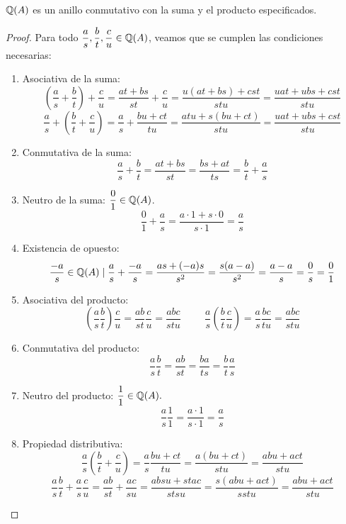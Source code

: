 \begin{lema}
    $\mathbb Q(A)$ es un anillo conmutativo con la suma y el producto especificados.
\end{lema}
\begin{proof}
    Para todo $\dfrac{a}{s}, \dfrac{b}{t}, \dfrac{c}{u} \in \mathbb Q(A)$, veamos que se cumplen las condiciones necesarias:
    \begin{enumerate}
        \item Asociativa de la suma:
        $$\left(\dfrac{a}{s} + \dfrac{b}{t}\right) + \dfrac{c}{u} = \dfrac{at + bs}{st} + \dfrac{c}{u} = \dfrac{u(at+bs)+cst}{stu}
            = \dfrac{uat + ubs + cst}{stu}$$
        $$\dfrac{a}{s} + \left(\dfrac{b}{t} + \dfrac{c}{u} \right) = \dfrac{a}{s}+ \dfrac{bu + ct}{tu} = \dfrac{atu + s(bu+ct)}{stu}
            = \dfrac{uat + ubs + cst}{stu}$$

        \item Conmutativa de la suma:
        $$\dfrac{a}{s} + \dfrac{b}{t} = \dfrac{at + bs}{st} = \dfrac{bs + at}{ts} = \dfrac{b}{t} + \dfrac{a}{s}$$

        \item Neutro de la suma: $\dfrac{0}{1} \in \mathbb Q(A)$.
        $$\dfrac{0}{1} + \dfrac{a}{s} = \dfrac{a\cdot 1 + s\cdot 0}{s \cdot 1} = \dfrac{a}{s}$$

        \item Existencia de opuesto:
        $$\dfrac{-a}{s} \in \mathbb Q(A) \mid \dfrac{a}{s} + \dfrac{-a}{s} = \dfrac{as + (-a)s}{s^2} = \dfrac{s(a-a)}{s^2} =
            \dfrac{a-a}{s} = \dfrac{0}{s} = \dfrac{0}{1}$$

        \item Asociativa del producto:
        $$\left(\dfrac{a}{s} \dfrac{b}{t} \right) \dfrac{c}{u} = \dfrac{ab}{st} \dfrac{c}{u} = \dfrac{abc}{stu}
        \hspace{1cm}
        \dfrac{a}{s} \left(\dfrac{b}{t} \dfrac{c}{u} \right) = \dfrac{a}{s} \dfrac{bc}{tu} = \dfrac{abc}{stu}$$

        \item Conmutativa del producto:
        $$\dfrac{a}{s} \dfrac{b}{t} = \dfrac{ab}{st} = \dfrac{ba}{ts} = \dfrac{b}{t} \dfrac{a}{s}$$

        \item Neutro del producto: $\dfrac{1}{1}\in \mathbb Q(A).$
        $$\dfrac{a}{s} \dfrac{1}{1} = \dfrac{a \cdot 1}{s \cdot 1} = \dfrac{a}{s}$$

        \item Propiedad distributiva:
        $$\dfrac{a}{s} \left( \dfrac{b}{t} + \dfrac{c}{u} \right) = \dfrac{a}{s} \dfrac{bu + ct}{tu} = \dfrac{a(bu+ct)}{stu}
            = \dfrac{abu + act}{stu}$$
        $$\dfrac{a}{s}\dfrac{b}{t} + \dfrac{a}{s}\dfrac{c}{u} = \dfrac{ab}{st} + \dfrac{ac}{su} = \dfrac{absu + stac}{stsu}
            = \dfrac{s(abu + act)}{sstu} = \dfrac{abu + act}{stu}$$
    \end{enumerate}
\end{proof}

